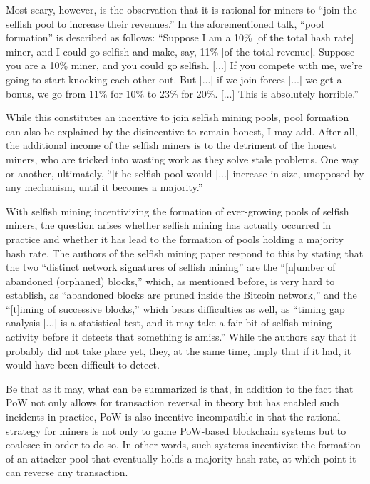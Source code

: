 Most scary, however, is the observation that it is rational for miners to  ``join the selfish pool to increase their revenues.''
In the aforementioned talk, ``pool formation'' is described as follows:
``Suppose I am a 10\% [of the total hash rate] miner, and I could go selfish and make, say, 11\% [of the total revenue].
Suppose you are a 10\% miner, and you could go selfish. [...]
If you compete with me, we're going to start knocking each other out.
But [...] if we join forces [...] we get a bonus, we go from 11\% for 10\% to 23\% for 20\%. [...]
This is absolutely horrible.''

While this constitutes an incentive to join selfish mining pools, pool formation can also be explained by the disincentive to remain honest, I may add.
After all, the additional income of the selfish miners is to the detriment of the honest miners, who are tricked into wasting work as they solve stale problems.
One way or another, ultimately, ``[t]he selfish pool would [...] increase in size, unopposed by any mechanism, until it becomes a majority.''

With selfish mining incentivizing the formation of ever-growing pools of selfish miners, the question arises whether selfish mining has actually occurred in practice and whether it has lead to the formation of pools holding a majority hash rate.
The authors of the selfish mining paper respond to this \autocite{hackingdistributed2014detectselfishminers} by stating that the two ``distinct network signatures of selfish mining'' are the ``[n]umber of abandoned (orphaned) blocks,'' which, as mentioned before, is very hard to establish, as ``abandoned blocks are pruned inside the Bitcoin network,'' and the ``[t]iming of successive blocks,'' which bears difficulties as well, as ``timing gap analysis [...] is a statistical test, and it may take a fair bit of selfish mining activity before it detects that something is amiss.''
While the authors say that it probably did not take place yet, they, at the same time, imply that if it had, it would have been difficult to detect.

Be that as it may, what can be summarized is that, in addition to the fact that PoW not only allows for transaction reversal in theory but has enabled such incidents in practice, PoW is also incentive incompatible in that the rational strategy for miners is not only to game PoW-based blockchain systems but to coalesce in order to do so.
In other words, such systems incentivize the formation of an attacker pool that eventually holds a majority hash rate, at which point it can reverse any transaction.

